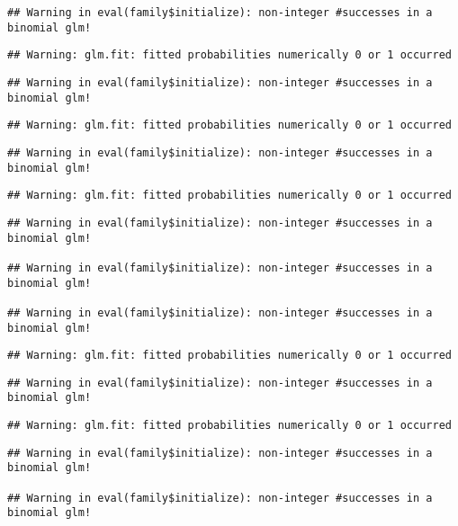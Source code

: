 \documentclass[
]{article}
\begin{document}
\begin{verbatim}
## Warning in eval(family$initialize): non-integer #successes in a binomial glm!
\end{verbatim}

\begin{verbatim}
## Warning: glm.fit: fitted probabilities numerically 0 or 1 occurred
\end{verbatim}

\begin{verbatim}
## Warning in eval(family$initialize): non-integer #successes in a binomial glm!
\end{verbatim}

\begin{verbatim}
## Warning: glm.fit: fitted probabilities numerically 0 or 1 occurred
\end{verbatim}

\begin{verbatim}
## Warning in eval(family$initialize): non-integer #successes in a binomial glm!
\end{verbatim}

\begin{verbatim}
## Warning: glm.fit: fitted probabilities numerically 0 or 1 occurred
\end{verbatim}

\begin{verbatim}
## Warning in eval(family$initialize): non-integer #successes in a binomial glm!

## Warning in eval(family$initialize): non-integer #successes in a binomial glm!

## Warning in eval(family$initialize): non-integer #successes in a binomial glm!
\end{verbatim}

\begin{verbatim}
## Warning: glm.fit: fitted probabilities numerically 0 or 1 occurred
\end{verbatim}

\begin{verbatim}
## Warning in eval(family$initialize): non-integer #successes in a binomial glm!
\end{verbatim}

\begin{verbatim}
## Warning: glm.fit: fitted probabilities numerically 0 or 1 occurred
\end{verbatim}

\begin{verbatim}
## Warning in eval(family$initialize): non-integer #successes in a binomial glm!

## Warning in eval(family$initialize): non-integer #successes in a binomial glm!
\end{verbatim}
\end{document}
